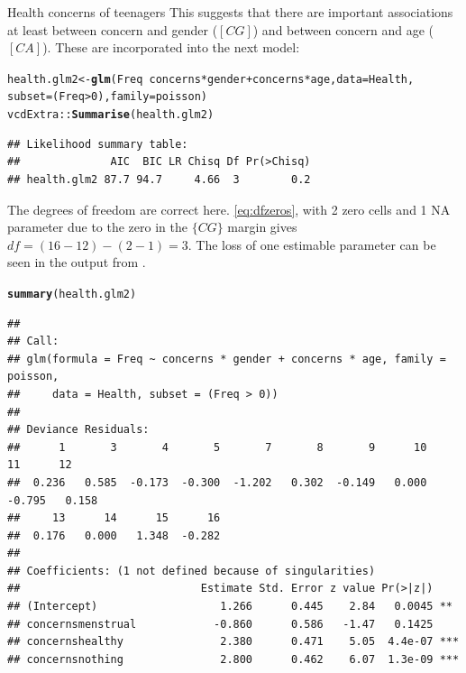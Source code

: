 \documentclass[11pt]{book}\usepackage[]{graphicx}\usepackage[]{color}
\makeatletter
\newcommand{\hlnum}[1]{\textcolor[rgb]{0.686,0.059,0.569}{#1}}%
\newcommand{\hlopt}[1]{\textcolor[rgb]{0,0,0}{#1}}%
\newcommand{\hlstd}[1]{\textcolor[rgb]{0.345,0.345,0.345}{#1}}%
\newcommand{\hlkwb}[1]{\textcolor[rgb]{0.69,0.353,0.396}{#1}}%
\newcommand{\hlkwc}[1]{\textcolor[rgb]{0.333,0.667,0.333}{#1}}%
\newcommand{\hlkwd}[1]{\textcolor[rgb]{0.737,0.353,0.396}{\textbf{#1}}}%
\newenvironment{kframe}{%
 \def\at@end@of@kframe{}%
 \ifinner\ifhmode%
  \def\at@end@of@kframe{\end{minipage}}%
  \begin{minipage}{\columnwidth}%
 \fi\fi%
 \def\FrameCommand##1{\hskip\@totalleftmargin \hskip-\fboxsep
 \colorbox{shadecolor}{##1}\hskip-\fboxsep
     \hskip-\linewidth \hskip-\@totalleftmargin \hskip\columnwidth}%
 \MakeFramed {\advance\hsize-\width
   \@totalleftmargin\z@ \linewidth\hsize
   \@setminipage}}%
 {\par\unskip\endMakeFramed%
 \at@end@of@kframe}
\newenvironment{knitrout}{}{} %
\renewenvironment{knitrout}{\small\renewcommand{\baselinestretch}{.85}}{} %
\makeatother
\begin{document}
\begin{Example}[health]{Health concerns of teenagers}
\begin{knitrout}
\end{knitrout}
This suggests that there are important associations at least between concern and gender
($[CG]$) and between concern and age ($[CA]$).
These are incorporated into the next model:
\begin{knitrout}
\color{fgcolor}\begin{kframe}
\begin{alltt}
\hlstd{health.glm2} \hlkwb{<-}\hlkwd{glm}\hlstd{(Freq} \hlopt{~}  \hlstd{concerns}\hlopt{*}\hlstd{gender} \hlopt{+} \hlstd{concerns}\hlopt{*}\hlstd{age,} \hlkwc{data}\hlstd{=Health,}
                  \hlkwc{subset}\hlstd{=(Freq}\hlopt{>}\hlnum{0}\hlstd{),} \hlkwc{family}\hlstd{=poisson)}
\hlstd{vcdExtra::}\hlkwd{Summarise}\hlstd{(health.glm2)}
\end{alltt}
\begin{verbatim}
## Likelihood summary table:
##              AIC  BIC LR Chisq Df Pr(>Chisq)
## health.glm2 87.7 94.7     4.66  3        0.2
\end{verbatim}
\end{kframe}
\end{knitrout}
The degrees of freedom are correct here.  \eqref{eq:dfzeros},
with 2 zero cells and 1 NA parameter due to the zero in the $\{CG\}$ margin
gives $df = (16-12) - (2-1) = 3$.  The loss of one estimable parameter
can be seen in the output from .
\begin{knitrout}\footnotesize
{}\color{fgcolor}\begin{kframe}
\begin{alltt}
\hlkwd{summary}\hlstd{(health.glm2)}
\end{alltt}
\begin{verbatim}
## 
## Call:
## glm(formula = Freq ~ concerns * gender + concerns * age, family = poisson, 
##     data = Health, subset = (Freq > 0))
## 
## Deviance Residuals: 
##      1       3       4       5       7       8       9      10      11      12  
##  0.236   0.585  -0.173  -0.300  -1.202   0.302  -0.149   0.000  -0.795   0.158  
##     13      14      15      16  
##  0.176   0.000   1.348  -0.282  
## 
## Coefficients: (1 not defined because of singularities)
##                            Estimate Std. Error z value Pr(>|z|)    
## (Intercept)                   1.266      0.445    2.84   0.0045 ** 
## concernsmenstrual            -0.860      0.586   -1.47   0.1425    
## concernshealthy               2.380      0.471    5.05  4.4e-07 ***
## concernsnothing               2.800      0.462    6.07  1.3e-09 ***

\end{verbatim}
\end{kframe}
\end{knitrout}
\end{Example}
\end{document}
